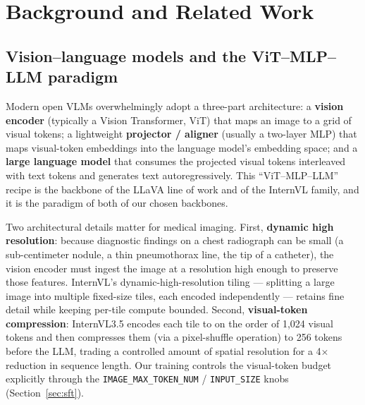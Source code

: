 \documentclass[11pt,a4paper]{article}
\begin{document}
\section{Background and Related Work}

\subsection{Vision--language models and the ViT--MLP--LLM paradigm}
Modern open VLMs overwhelmingly adopt a three-part architecture: a \textbf{vision encoder} (typically a Vision Transformer, ViT) that maps an image to a grid of visual tokens; a lightweight \textbf{projector / aligner} (usually a two-layer MLP) that maps visual-token embeddings into the language model's embedding space; and a \textbf{large language model} that consumes the projected visual tokens interleaved with text tokens and generates text autoregressively. This ``ViT--MLP--LLM'' recipe is the backbone of the LLaVA line of work and of the InternVL family, and it is the paradigm of both of our chosen backbones.

Two architectural details matter for medical imaging. First, \textbf{dynamic high resolution}: because diagnostic findings on a chest radiograph can be small (a sub-centimeter nodule, a thin pneumothorax line, the tip of a catheter), the vision encoder must ingest the image at a resolution high enough to preserve those features. InternVL's dynamic-high-resolution tiling --- splitting a large image into multiple fixed-size tiles, each encoded independently --- retains fine detail while keeping per-tile compute bounded. Second, \textbf{visual-token compression}: InternVL3.5 encodes each tile to on the order of 1{,}024 visual tokens and then compresses them (via a pixel-shuffle operation) to 256 tokens before the LLM, trading a controlled amount of spatial resolution for a 4$\times$ reduction in sequence length. Our training controls the visual-token budget explicitly through the \texttt{IMAGE\_MAX\_TOKEN\_NUM} / \texttt{INPUT\_SIZE} knobs (Section~\ref{sec:sft}).
\end{document}
